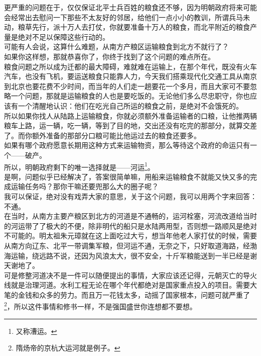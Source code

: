 \begin{multicols}{\theparacolNo}
更严重的问题在于，仅仅保证北平士兵百姓的粮食还不够，因为明朝政府将来可能会经常出去慰问一下那些不太友好的邻居，给他们一点小小的教训，所谓兵马未动，粮草先行，派十万人去打仗，你就要准备十万人的粮食，而北平附近的粮食产量是绝对不足以保障这些行动的。\\

可能有人会说，这算什么难题，从南方产粮区运输粮食到北方不就行了？\\

如果你这样想，那就恭喜你了，你终于找到了这个问题的难点所在。\\

粮食问题之所以成为迁都的最大障碍，难就难在运输上，在那个年代，既没有火车汽车，也没有飞机，要运送粮食只能靠人力，今天我们搭乘现代化交通工具从南京到北京也要花费不少时间，而当年的人们走一趟要花一个多月，而且大家可不要忽略一个问题，那就是运输粮食的人也是要吃饭的。无论他们多么尽忠职守，你也应该有一个清醒地认识：他们在吃光自己所运的粮食之前，是绝对不会饿死的。\\

所以如果你找人从陆路上运输粮食，你就必须额外准备运输者的口粮，让他推两辆粮车上路，运一辆，吃一辆，等到了目的地，交出还没有吃完的那部分，就算交差了。而你额外准备的那部分口粮可能比他运过去的粮食还要多。\\

如果有哪个政府愿意长期用这种方式来运输物资，那么等待这个政府的命运只有一个——破产。\\

所以，明朝政府剩下的唯一选择就是——河运\footnote{又称漕运。}。\\

是啊，问题似乎已经解决了，答案很简单嘛，用船来运输粮食不就能又快又多的完成运输任务吗？那你干嘛还要兜那么大的圈子呢？\\

我可以保证，绝对没有戏弄大家的意思，关于这个问题，我可以用两个字来回答：\\

不通。\\

在当时，从南方主要产粮区到北方的河道是不通畅的，运河栓塞，河流改道给当时的河运带了了极大的不便，除非明代的船只是水陆两用型，否则想一路顺风是绝对不可能的。明太祖朱元璋就在这上面吃过大亏，想当年他老人家打仗的时候，需要从南方向辽东、北平一带调集军粮，但河运不通，无奈之下，只好取道海路，经渤海运输，绕远路不说，还因为风浪太大，很不安全，十斤军粮能送到一半已经是谢天谢地了。\\

可是修整河道决不是一件可以随便提出的事情，大家应该还记得，元朝灭亡的导火线就是治理河道。水利工程无论在哪个年代都绝对是国家重点投入的项目。需要大笔的金钱和众多的劳力。而且万一花钱太多，动摇了国家根本，问题可就严重了\footnote{隋炀帝的京杭大运河就是例子。}，所以这件事情和修书一样，不是强国盛世你连想都不要想。\\


\end{multicols}
